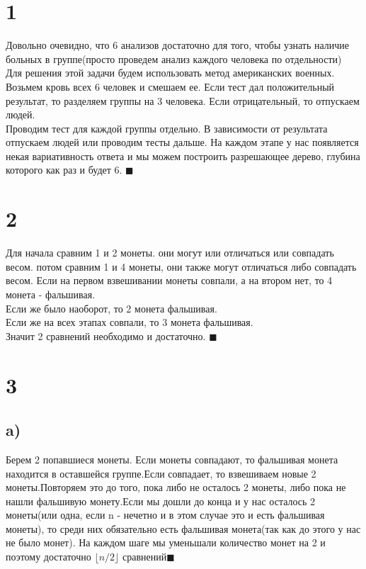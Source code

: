 


	\section*{1}
	Довольно очевидно, что 6 анализов достаточно для того, чтобы узнать наличие больных в группе(просто проведем анализ каждого человека по отдельности) \\
	Для решения этой задачи будем использовать метод американских военных.  \\
	Возьмем кровь всех 6 человек и смешаем ее. Если тест дал положительный результат, то  разделяем группы на 3 человека. Если отрицательный, то отпускаем людей. \\
	Проводим тест для каждой группы отдельно. 	В зависимости от результата отпускаем людей или проводим тесты дальше. На каждом этапе у нас появляется некая вариативность ответа и мы можем построить разрешающее дерево, глубина которого как раз и будет 6. 
	$\blacksquare$ 
	\section*{2}
	Для начала сравним 1 и 2 монеты. они могут или отличаться или совпадать весом. потом сравним 1 и 4 монеты, они также могут отличаться либо совпадать весом. Если на первом взвешивании монеты совпали, а на втором нет, то 4 монета - фальшивая. \\
	Если же было наоборот, то 2 монета фальшивая.  \\
	Если же на всех этапах совпали, то 3 монета фальшивая. \\
	Значит 2 сравнений необходимо и достаточно. $\blacksquare$
	\section*{3}
	\subsection*{a)}
	Берем 2 попавшиеся монеты. Если монеты совпадают, то фальшивая монета находится в оставшейся группе.Если совпадает, то взвешиваем новые 2 монеты.Повторяем это до того, пока либо не осталось 2 монеты, либо пока не нашли фальшивую монету.Если мы дошли до конца и у нас осталось 2 монеты(или одна, если n - нечетно и в этом случае это и есть фальшивая монеты), то среди них обязательно есть фальшивая монета(так как до этого у нас не было монет). На каждом шаге мы уменьшали количество монет на 2 и поэтому достаточно $\lfloor n/2 \rfloor$ сравнений$\blacksquare$
